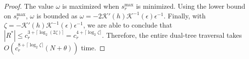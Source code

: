 \begin{proof}






The value $\omega$ is maximized when $s_r^{\max}$ is minimized.  Using the lower
bound on $s_r^{\max}$, $\omega$ is bounded as
%
$\omega = -2 \mathcal{K}'(h) \mathcal{K}^{-1}(\epsilon) \epsilon^{-1}$.
%
Finally, with $\zeta = -\mathcal{K}'(h) \mathcal{K}^{-1}(\epsilon)
\epsilon^{-1}$, we are able to conclude that $|R^*| \le c_r^{3 + \lceil \log_2
(2 \zeta ) \rceil} = c_r^{4 + \lceil \log_2 \zeta \rceil}$.  Therefore, the
entire dual-tree traversal takes $O(c_r^{8 + \lceil \log_2 \zeta \rceil} (N +
\theta))$ time.


\end{proof}
